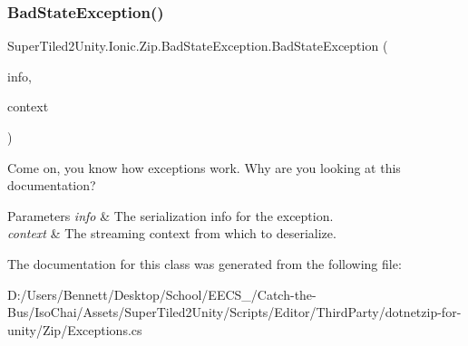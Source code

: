 \subsubsection{\texorpdfstring{Bad\+State\+Exception()}{BadStateException()}\hspace{0.1cm}{\footnotesize\ttfamily [4/4]}}
{\footnotesize\ttfamily Super\+Tiled2\+Unity.\+Ionic.\+Zip.\+Bad\+State\+Exception.\+Bad\+State\+Exception (\begin{DoxyParamCaption}\item[{Serialization\+Info}]{info,  }\item[{Streaming\+Context}]{context }\end{DoxyParamCaption})\hspace{0.3cm}{\ttfamily [protected]}}



Come on, you know how exceptions work. Why are you looking at this documentation? 


\begin{DoxyParams}{Parameters}
{\em info} & The serialization info for the exception.\\
\hline
{\em context} & The streaming context from which to deserialize.\\
\hline
\end{DoxyParams}


The documentation for this class was generated from the following file\+:\begin{DoxyCompactItemize}
\item 
D\+:/\+Users/\+Bennett/\+Desktop/\+School/\+E\+E\+C\+S\+\_/\+Catch-\/the-\/\+Bus/\+Iso\+Chai/\+Assets/\+Super\+Tiled2\+Unity/\+Scripts/\+Editor/\+Third\+Party/dotnetzip-\/for-\/unity/\+Zip/Exceptions.\+cs\end{DoxyCompactItemize}
